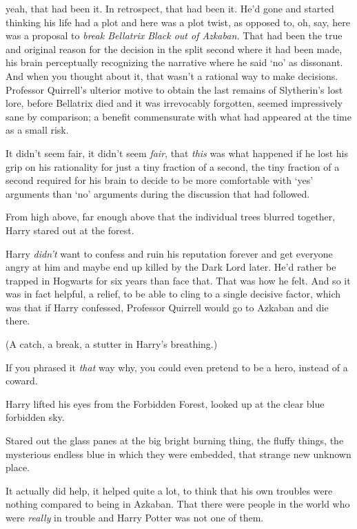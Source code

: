 {\el} yeah, that had been it. In retrospect, that had been it. He'd gone and
started thinking his life had a plot and here was a plot twist, as opposed to,
oh, say, here was a proposal to \emph{break Bellatrix Black out of Azkaban.}
That had been the true and original reason for the decision in the split second
where it had been made, his brain perceptually recognizing the narrative where
he said `no' as dissonant. And when you thought about it, that wasn't a
rational way to make decisions. Professor Quirrell's ulterior motive to obtain
the last remains of Slytherin's lost lore, before Bellatrix died and it was
irrevocably forgotten, seemed impressively sane by comparison; a benefit
commensurate with what had appeared at the time as a small risk.

It didn't seem fair, it didn't seem \emph{fair}, that \emph{this} was what
happened if he lost his grip on his rationality for just a tiny fraction of a
second, the tiny fraction of a second required for his brain to decide to be
more comfortable with `yes' arguments than `no' arguments during the discussion
that had followed.

From high above, far enough above that the individual trees blurred together,
Harry stared out at the forest.

Harry \emph{didn't} want to confess and ruin his reputation forever and get
everyone angry at him and maybe end up killed by the Dark Lord later. He'd
rather be trapped in Hogwarts for six years than face that. That was how he
felt. And so it was in fact helpful, a relief, to be able to cling to a single
decisive factor, which was that if Harry confessed, Professor Quirrell would go
to Azkaban and die there.

(A catch, a break, a stutter in Harry's breathing.)

If you phrased it \emph{that} way{\el} why, you could even pretend to be a
hero, instead of a coward.

Harry lifted his eyes from the Forbidden Forest, looked up at the clear blue
forbidden sky.

Stared out the glass panes at the big bright burning thing, the fluffy things,
the mysterious endless blue in which they were embedded, that strange new
unknown place.

It{\el} actually did help, it helped quite a lot, to think that his own
troubles were nothing compared to being in Azkaban. That there were people in
the world who were \emph{really} in trouble and Harry Potter was not one of
them.

